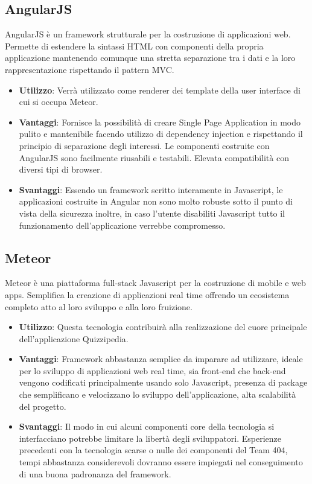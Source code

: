 	\subsection{AngularJS}
	AngularJS è un framework strutturale per la costruzione di applicazioni web. Permette di estendere la sintassi HTML con componenti della propria applicazione mantenendo comunque una stretta separazione tra i dati e la loro rappresentazione rispettando il pattern MVC.
	\begin{itemize}
		\item\textbf{Utilizzo}: Verrà utilizzato come renderer dei template della user interface di cui si occupa Meteor.
		\item\textbf{Vantaggi}: Fornisce la possibilità di creare Single Page Application in modo pulito e mantenibile facendo utilizzo di dependency injection e rispettando il principio di separazione degli interessi. Le componenti costruite con AngularJS sono facilmente riusabili e testabili. Elevata compatibilità con diversi tipi di browser.
		\item\textbf{Svantaggi}: Essendo un framework scritto interamente in Javascript, le applicazioni costruite in Angular non sono molto robuste sotto il punto di vista della sicurezza inoltre, in caso l'utente disabiliti Javascript tutto il funzionamento dell'applicazione verrebbe compromesso.
	\end{itemize}
	\subsection{Meteor}
	Meteor è una piattaforma full-stack Javascript per la costruzione di mobile e web apps. Semplifica la creazione di applicazioni real time offrendo un ecosistema completo atto al loro sviluppo e alla loro fruizione.
	\begin{itemize}
		\item\textbf{Utilizzo}: Questa tecnologia contribuirà alla realizzazione del cuore principale dell'applicazione Quizzipedia.
		\item\textbf{Vantaggi}: Framework abbastanza semplice da imparare ad utilizzare, ideale per lo sviluppo di applicazioni web real time, sia front-end che back-end vengono codificati principalmente usando solo Javascript, presenza di package che semplificano e velocizzano lo sviluppo dell'applicazione, alta scalabilità del progetto.
		\item\textbf{Svantaggi}: Il modo in cui alcuni componenti core della tecnologia si interfacciano potrebbe limitare la libertà degli sviluppatori. Esperienze precedenti con la tecnologia scarse o nulle dei componenti del Team 404, tempi abbastanza considerevoli dovranno essere impiegati nel conseguimento di una buona padronanza del framework.
	\end{itemize}
	\newpage